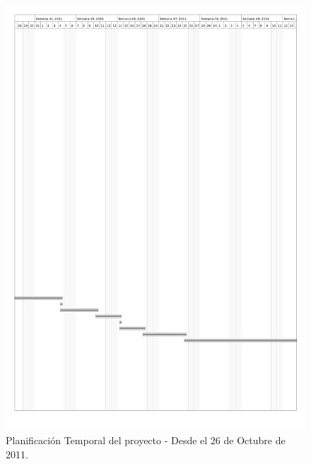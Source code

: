 \pagebreak
\begin{figure}[H]
\begin{center}
\includegraphics[width=15.5cm]{planificacion_graphvisualx_5.png}
\caption{Planificación Temporal del proyecto - Desde el 26 de Octubre de 2011.}
\end{center}
\end{figure}

